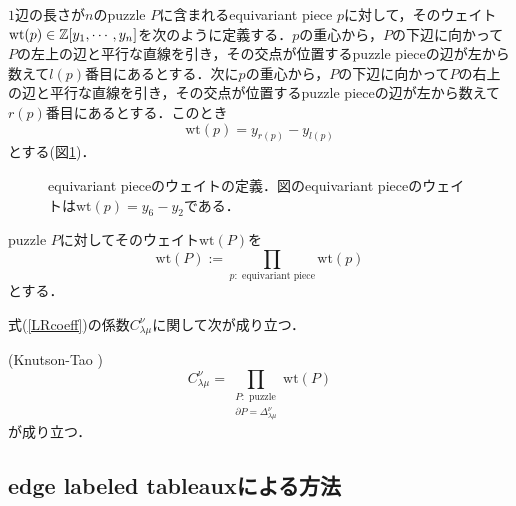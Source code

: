 \begin{defin}\label{weight of piece}
  $1$辺の長さが$n$のpuzzle $P$に含まれるequivariant piece $p$に対して，そのウェイト$\text{wt}(p) \in\mathbb{Z}[y_1,\cdots,y_n]$を次のように定義する．$p$の重心から，$P$の下辺に向かって$P$の左上の辺と平行な直線を引き，その交点が位置するpuzzle pieceの辺が左から数えて$l(p)$番目にあるとする．次に$p$の重心から，$P$の下辺に向かって$P$の右上の辺と平行な直線を引き，その交点が位置するpuzzle pieceの辺が左から数えて$r(p)$番目にあるとする．このとき
  \[
  \text{wt}(p)=y_{r(p)}-y_{l(p)}
  \]
  とする(図\ref{puzzle weight})．
\end{defin}

\begin{figure}[htbp]
  \centering
  \caption{equivariant pieceのウェイトの定義．図のequivariant pieceのウェイトは$\text{wt}(p)=y_6-y_2$である．}\label{puzzle weight}
\end{figure}


\begin{defin}
  puzzle $P$に対してそのウェイト$\text{wt}(P)$を
  \[
  \text{wt}(P):=\prod_{p:\text{ equivariant piece}}\text{wt}(p)
  \]
  とする．
\end{defin}

式(\ref{LRcoeff})の係数$C^\nu_{\lambda\mu}$に関して次が成り立つ．

\begin{theo}(Knutson-Tao \cite{knutson tao})
  \[
  C^\nu_{\lambda\mu}=\prod_{\substack{P:\text{ puzzle} \\ \partial P = \Delta^\nu_{\lambda\mu}}}\text{wt}(P)
  \]
  が成り立つ．
\end{theo}



\subsection{edge labeled tableauxによる方法}

